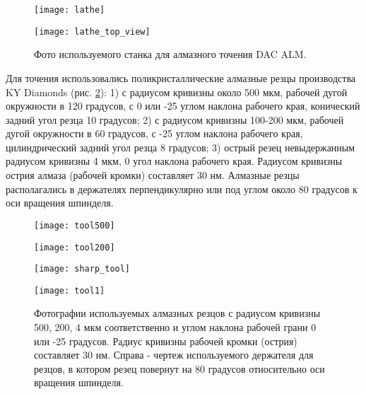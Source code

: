 \begin{figure}[ht]
  \begin{minipage}[ht]{0.49\linewidth}\centering
    \texttt{[image: lathe]}
  \end{minipage}
  \hfill
  \begin{minipage}[ht]{0.49\linewidth}\centering
    \texttt{[image: lathe\_top\_view]}
  \end{minipage}
  \caption{Фото используемого станка для алмазного точения DAC ALM.}
  \label{lathe}
\end{figure}

Для точения использовались поликристаллические алмазные резцы производства KY Diamonds (рис. \ref{diamond_tools}): 1) с радиусом кривизны около 500 мкм, рабочей дугой окружности в 120 градусов, с 0 или -25 углом наклона рабочего края, конический задний угол резца 10 градусов; 2) с радиусом кривизны 100-200 мкм, рабочей дугой окружности в 60 градусов, с -25 углом наклона рабочего края, цилиндрический задний угол резца 8 градусов; 3) острый резец невыдержанным радиусом кривизны 4 мкм, 0 угол наклона рабочего края. Радиусом кривизны острия алмаза (рабочей кромки) составляет 30 нм. Алмазные резцы располагались в держателях перпендикулярно или под углом около 80 градусов к оси вращения шпинделя.

\begin{figure}[ht]
  \begin{minipage}[ht]{0.24\linewidth}\centering
    \texttt{[image: tool500]}
  \end{minipage}
  \hfill
  \begin{minipage}[ht]{0.24\linewidth}\centering
    \texttt{[image: tool200]}
  \end{minipage}
  \hfill
  \begin{minipage}[ht]{0.24\linewidth}\centering
    \texttt{[image: sharp\_tool]}
  \end{minipage}
  \hfill
  \begin{minipage}[ht]{0.24\linewidth}\centering
    \texttt{[image: tool1]}
  \end{minipage}
  \caption{Фотографии используемых алмазных резцов с радиусом кривизны 500, 200, 4 мкм соответственно и углом наклона рабочей грани 0 или -25 градусов. Радиус кривизны рабочей кромки (острия) составляет 30 нм. Справа - чертеж используемого держателя для резцов, в котором резец повернут на 80 градусов относительно оси вращения шпинделя.}
  \label{diamond_tools}
\end{figure}

